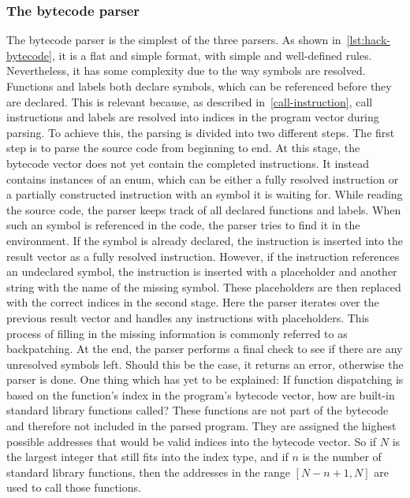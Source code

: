 \subsubsection{The bytecode parser} \label{bytecode-parser}
The bytecode parser is the simplest of the three parsers.
As shown in~\cref{lst:hack-bytecode}, it is a flat and simple format, with simple and well-defined rules.
Nevertheless, it has some complexity due to the way symbols are resolved.
Functions and labels both declare symbols, which can be referenced before they are declared.
This is relevant because, as described in~\cref{call-instruction}, call instructions and labels are resolved into indices in the program vector during parsing.
To achieve this, the parsing is divided into two different steps.
The first step is to parse the source code from beginning to end.
At this stage, the bytecode vector does not yet contain the completed instructions.
It instead contains instances of an enum, which can be either a fully resolved instruction or a partially constructed instruction with an symbol it is waiting for.
While reading the source code, the parser keeps track of all declared functions and labels.
When such an symbol is referenced in the code, the parser tries to find it in the environment.
If the symbol is already declared, the instruction is inserted into the result vector as a fully resolved instruction.
However, if the instruction references an undeclared symbol, the instruction is inserted with a placeholder and another string with the name of the missing symbol.
These placeholders are then replaced with the correct indices in the second stage.
Here the parser iterates over the previous result vector and handles any instructions with placeholders.
This process of filling in the missing information is commonly referred to as backpatching.
At the end, the parser performs a final check to see if there are any unresolved symbols left.
Should this be the case, it returns an error, otherwise the parser is done.
One thing which has yet to be explained: If function dispatching is based on the function's index in the program's bytecode vector, how are built-in standard library functions called?
These functions are not part of the bytecode and therefore not included in the parsed program.
They are assigned the highest possible addresses that would be valid indices into the bytecode vector.
So if \(N\) is the largest integer that still fits into the index type, and if \(n\) is the number of standard library functions, then the addresses in the range \([N - n + 1, N]\) are used to call those functions.
